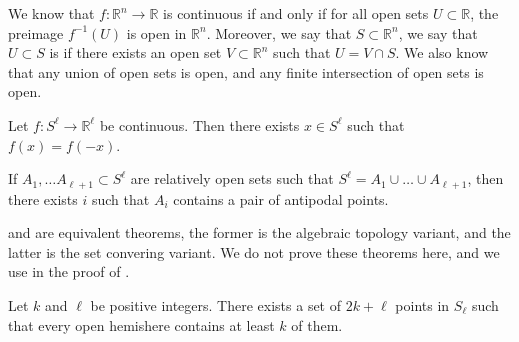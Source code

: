 We know that \(f \colon \mathbb{R}^n \to \mathbb{R}\) is continuous if and only if for all open sets \(U \subset \mathbb{R}\), the preimage \(f^{-1}(U)\) is open in \(\mathbb{R}^n\).
Moreover, we say that \(S \subset \mathbb{R}^n\), we say that \(U \subset S\) is  if there exists an open set \(V \subset \mathbb{R}^n\) such that \(U = V \cap S\).
We also know that any union of open sets is open, and any finite intersection of open sets is open.

\begin{theorem} \label{thm:borsuk-ulam}
    Let \(f \colon S^\ell \to \mathbb{R}^\ell\) be continuous.
    Then there exists \(x \in S^\ell\) such that \(f(x) = f(-x)\).
\end{theorem}

\begin{theorem} \label{thm:lusternik-schnirelmann}
    If \(A_1, \dots A_{\ell + 1} \subset S^\ell\) are relatively open sets such that \(S^\ell = A_1 \cup \dots \cup A_{\ell + 1}\),
    then there exists \(i\) such that \(A_i\) contains a pair of antipodal points.
\end{theorem}

 and  are equivalent theorems, the former is the algebraic topology variant, and the latter is the set convering variant.
We do not prove these theorems here, and we use  in the proof of .

\begin{theorem} \label{thm:gale}
    Let \(k\) and \(\ell\) be positive integers.
    There exists a set of \(2k+\ell\) points in \(S_\ell\)
    such that every open hemishere contains at least \(k\) of them.
\end{theorem}

